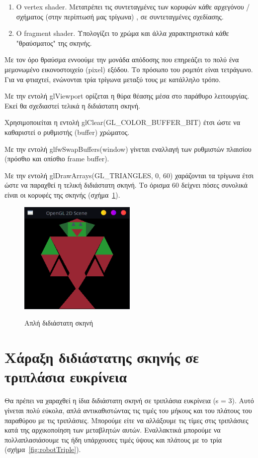 \documentclass[12pt]{article}
\begin{document}
\begin{enumerate}
  \item O vertex shader. Μετατρέπει τις συντεταγμένες των κορυφών κάθε αρχεγόνου / σχήματος (στην περίπτωσή μας τρίγωνα) , σε συντεταγμένες σχεδίασης.
  \item O fragment shader. Υπολογίζει το χρώμα και άλλα χαρακτηριστικά κάθε "θραύσματος" της σκηνής.
\end{enumerate}

 Με τον όρο θραύσμα εννοούμε την μονάδα απόδοσης που επηρεάζει το πολύ ένα μεμονωμένο εικονοστοιχείο (pixel) εξόδου. Το πρόσωπο του ρομπότ είναι τετράγωνο. Για να φτιαχτεί, ενώνονται τρία τρίγωνα μεταξύ τους με κατάλληλο τρόπο.
 
 Με την εντολή glViewport ορίζεται η θύρα θέασης μέσα στο παράθυρο λειτουργίας. Εκεί θα σχεδιαστεί τελικά η διδιάστατη σκηνή. 

Χρησιμοποιείται η εντολή glClear(GL\_COLOR\_BUFFER\_BIT) έτσι ώστε να καθαριστεί ο ρυθμιστής (buffer) χρώματος. 

Με την εντολή glfwSwapBuffers(window) γίνεται εναλλαγή των ρυθμιστών πλαισίου (πρόσθιο και οπίσθιο frame buffer). 

Με την εντολή glDrawArrays(GL\_TRIANGLES, 0, 60) χαράζονται τα τρίγωνα έτσι ώστε να παραχθεί η τελική διδιάστατη σκηνή. Το όρισμα 60 δείχνει πόσες συνολικά είναι οι κορυφές της σκηνής (σχήμα~\ref{fig:robotOriginal}).

\begin{figure}[!h]
\centering
    {\includegraphics[width=0.5\textwidth]
    {robot_original.png}}
    \caption{\label{fig:robotOriginal} Απλή διδιάστατη σκηνή}
\end{figure}

\section{Χάραξη διδιάστατης σκηνής σε τριπλάσια ευκρίνεια}
Θα πρέπει να χαραχθεί η ίδια διδιάστατη σκηνή σε τριπλάσια ευκρίνεια (s = 3). Αυτό γίνεται πολύ εύκολα, απλά αντικαθιστώντας τις τιμές του μήκους και του πλάτους του παραθύρου με τις τριπλάσιες. Μπορούμε είτε να αλλάξουμε τις τίμες στις τριπλάσιες κατά της αρχικοποίηση των μεταβλητών αυτών. Εναλλακτικά μπορούμε να πολλαπλασιάσουμε τις ήδη υπάρχουσες τιμές ύψους και πλάτους με το τρία (σχήμα~\ref{fig:robotTriple}).
\end{document}
